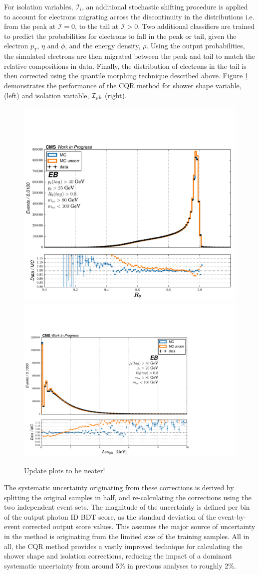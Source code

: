 For isolation variables, $\mathcal{I}_i$, an additional stochastic shifting procedure is applied to account for electrons migrating across the discontinuity in the distributions i.e. from the peak at $\mathcal{I}=0$, to the tail at $\mathcal{I}>0$. Two additional classifiers are trained to predict the probabilities for electrons to fall in the peak or tail, given the electron $p_T$, $\eta$ and $\phi$, and the energy density, $\rho$. Using the output probabilities, the simulated electrons are then migrated between the peak and tail to match the relative compositions in data. Finally, the distribution of electrons in the tail is then corrected using the quantile morphing technique described above. Figure \ref{fig:photon_id_0} demonstrates the performance of the CQR method for shower shape variable, \RNINE (left) and isolation variable, $\mathcal{I}_{\rm{ph}}$ (right).

\begin{figure}[hptb]
  \centering
  \includegraphics[width=.49\textwidth]{Figures/hgg_overview/dataMC_probeR9_0.pdf}
  \includegraphics[width=.49\textwidth]{Figures/hgg_overview/dataMC_probePhoIso_0.pdf}
  \caption[Corrections from the chained quantile regression method for \RNINE and $\mathcal{I}_{\rm{ph}}$]
  {
    Update plots to be neater!
  }
  \label{fig:photon_id_0}
\end{figure}

The systematic uncertainty originating from these corrections is derived by splitting the original \Zee samples in half, and re-calculating the corrections using the two independent event sets. The magnitude of the uncertainty is defined per bin of the output photon ID BDT score, as the standard deviation of the event-by-event corrected output score values. This assumes the major source of uncertainty in the method is originating from the limited size of the training samples. All in all, the CQR method provides a vastly improved technique for calculating the shower shape and isolation corrections, reducing the impact of a dominant systematic uncertainty from around 5\% in previous \Hgg analyses to roughly 2\%.

